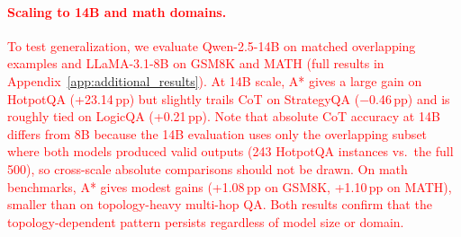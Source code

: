 \documentclass[11pt]{article}
\begin{document}
\textcolor{red}{\paragraph{Scaling to 14B and math domains.}
To test generalization, we evaluate Qwen-2.5-14B on matched overlapping examples and LLaMA-3.1-8B on GSM8K and MATH (full results in Appendix~\ref{app:additional_results}). At 14B scale, A* gives a large gain on HotpotQA (+23.14\,pp) but slightly trails CoT on StrategyQA ($-$0.46\,pp) and is roughly tied on LogicQA (+0.21\,pp). Note that absolute CoT accuracy at 14B differs from 8B because the 14B evaluation uses only the overlapping subset where both models produced valid outputs (243 HotpotQA instances vs.\ the full 500), so cross-scale absolute comparisons should not be drawn. On math benchmarks, A* gives modest gains (+1.08\,pp on GSM8K, +1.10\,pp on MATH), smaller than on topology-heavy multi-hop QA. Both results confirm that the topology-dependent pattern persists regardless of model size or domain.}





\end{document}
